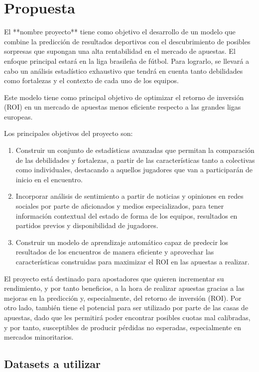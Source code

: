 \section{Propuesta}

El **nombre proyecto** tiene como objetivo el desarrollo de un modelo que combine la predicción de resultados deportivos con el descubrimiento de posibles sorpresas que supongan una alta rentabilidad en el mercado de apuestas. El enfoque principal estará en la liga brasileña de fútbol. Para lograrlo, se llevará a cabo un análisis estadístico exhaustivo que tendrá en cuenta tanto debilidades como fortalezas y el contexto de cada uno de los equipos.

Este modelo tiene como principal objetivo de optimizar el retorno de inversión (ROI) en un mercado de apuestas menos eficiente respecto a las grandes ligas europeas.

Los principales objetivos del proyecto son:

\begin{enumerate}
    \item Construir un conjunto de estadísticas avanzadas que permitan la comparación de las debilidades y fortalezas, a partir de las características tanto a colectivas como individuales, destacando a aquellos jugadores que van a participarán de inicio en el encuentro.
    \item Incorporar análisis de sentimiento a partir de noticias y opiniones en redes sociales por parte de aficionados y medios especializados, para tener información contextual del estado de forma de los equipos, resultados en partidos previos y disponibilidad de jugadores.
    \item Construir un modelo de aprendizaje automático capaz de predecir los resultados de los encuentros de manera eficiente y aprovechar las características construidas para maximizar el ROI en las apuestas a realizar.
\end{enumerate}

El proyecto está destinado para apostadores que quieren incrementar su rendimiento, y por tanto beneficios, a la hora de realizar apuestas gracias a las mejoras en la predicción y, especialmente, del retorno de inversión (ROI). Por otro lado, también tiene el potencial para ser utilizado por parte de las casas de apuestas, dado que les permitirá poder encontrar posibles cuotas mal calibradas, y por tanto, susceptibles de producir pérdidas no esperadas, especialmente en mercados minoritarios.

\subsection{Datasets a utilizar}

